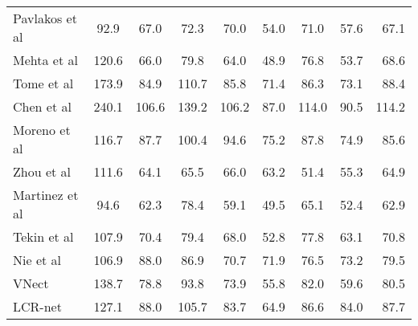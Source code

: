 \begin{table*}
{\begin{tabular}{@{}lcccccccr@{}}
\multicolumn{1}{l||}{Pavlakos et al \cite{pavlakos_volumetric_cvpr17}\T}                              &  92.9       & 67.0   & 72.3    &  70.0    & 54.0 & 71.0  &  \multicolumn{1}{c||}{57.6}         &  67.1     \\
\multicolumn{1}{l||}{Mehta et al \cite{mehta_mono_3dv17} }                                                                & 120.6    & 66.0   & 79.8    & 64.0   &  48.9   & 76.8    & \multicolumn{1}{c||}{53.7}     & {68.6}  \\ 
\multicolumn{1}{l||}{Tome et al \cite{tome_lifting_2017} }    & 173.9   & 84.9  & 110.7    & 85.8   &  71.4   & 86.3   & \multicolumn{1}{c||}{73.1}     & {88.4}  \\ 
\multicolumn{1}{l||}{Chen et al \cite{chen_2d_match_cvpr17} }                              & 240.1            & 106.6       & 139.2       & 106.2       & 87.0  & 114.0   & \multicolumn{1}{c||}{90.5}         & 114.2       \\
\multicolumn{1}{l||}{Moreno et al \cite{moreno_distance_matrix_cvpr17} }                              & 116.7            & 87.7       & 100.4       & 94.6       & 75.2  & 87.8   & \multicolumn{1}{c||}{74.9}         & 85.6       \\
\multicolumn{1}{l||}{Zhou et al \cite{zhou2017towards} }                              & 111.6            & 64.1       & 65.5       &  66.0       & 63.2  & 51.4   & \multicolumn{1}{c||}{55.3}         & 64.9       \\
\multicolumn{1}{l||}{Martinez et al \cite{martinez20173dbaseline} }            & 94.6         & 62.3       & 78.4     &  59.1       & 49.5  & 65.1   & \multicolumn{1}{c||}{52.4}         & 62.9       \\
\multicolumn{1}{l||}{Tekin et al \cite{tekin_fusion_arxiv16} }            & 107.9         & 70.4       & 79.4    &  68.0       & 52.8  & 77.8   & \multicolumn{1}{c||}{63.1}         & 70.8       \\
\multicolumn{1}{l||}{Nie et al \cite{nie2017monocular} }            & 106.9         & 88.0       & 86.9    &  70.7       & 71.9  & 76.5   & \multicolumn{1}{c||}{73.2}         & 79.5       \\
\multicolumn{1}{l||}{VNect \cite{VNect_SIGGRAPH2017}\T}                              & 138.7            & 78.8       & 93.8       & 73.9       & {55.8}  & 82.0   & \multicolumn{1}{c||}{{59.6}}         & 80.5       \\
\multicolumn{1}{l||}{LCR-net \cite{rogez_lcr_cvpr17} }                              & 127.1            & 88.0       & 105.7       & 83.7       & 64.9  & 86.6   & \multicolumn{1}{c||}{84.0}         & 87.7       \\ \hline \hline

\end{tabular}}
\end{table*}
